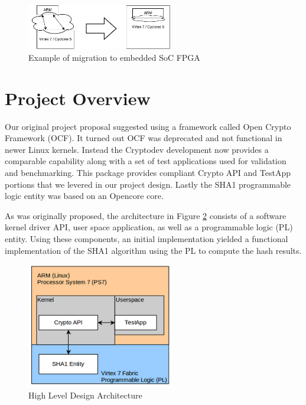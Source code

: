 \documentclass[journal]{IEEEtran}
\begin{document}
\begin{figure}[ht]
\centering
\includegraphics[width=2.5in]{socBlk.png}
\caption{Example of migration to embedded SoC FPGA}
\label{fig_socBlk}
\end{figure} 

\section{Project Overview}
Our original project proposal suggested using a framework called Open Crypto Framework (OCF)\cite{OCF2013}.  It turned out OCF was deprecated and not functional in newer Linux kernels.  Instead the Cryptodev development now provides a comparable capability along with a set of test applications used for validation and benchmarking.  This package provides compliant Crypto API and TestApp portions that we levered in our project design.  Lastly the SHA1 programmable logic entity was based on an Opencore core.

As was originally proposed, the architecture in Figure \ref{fig_archBlkH} consists of a software kernel driver API, user space application, as well as a programmable logic (PL) entity.  Using these components, an initial implementation yielded a functional implementation of the SHA1 algorithm using the PL to compute the hash results.

\begin{figure}[ht]
\centering
\includegraphics[width=2.5in]{highleveldesigndiagram.png}
\caption{High Level Design Architecture}
\label{fig_archBlkH}
\end{figure} 
\end{document}

